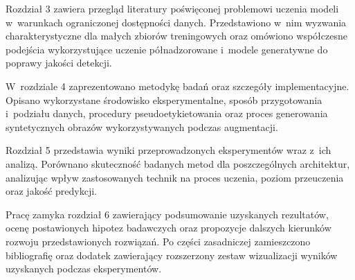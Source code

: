 Rozdział 3 zawiera przegląd literatury poświęconej problemowi uczenia modeli w~warunkach ograniczonej dostępności danych. Przedstawiono w~nim wyzwania charakterystyczne dla małych zbiorów treningowych oraz omówiono współczesne podejścia wykorzystujące uczenie półnadzorowane i~modele generatywne do poprawy jakości detekcji.

W~rozdziale 4 zaprezentowano metodykę badań oraz szczegóły implementacyjne. Opisano wykorzystane środowisko eksperymentalne, sposób przygotowania i~podziału danych, procedury pseudoetykietowania oraz proces generowania syntetycznych obrazów wykorzystywanych podczas augmentacji.

Rozdział 5 przedstawia wyniki przeprowadzonych eksperymentów wraz z~ich analizą. Porównano skuteczność badanych metod dla poszczególnych architektur, analizując wpływ zastosowanych technik na proces uczenia, poziom przeuczenia oraz jakość predykcji.

Pracę zamyka rozdział 6 zawierający podsumowanie uzyskanych rezultatów, ocenę postawionych hipotez badawczych oraz propozycje dalszych kierunków rozwoju przedstawionych rozwiązań. Po części zasadniczej zamieszczono bibliografię oraz dodatek zawierający rozszerzony zestaw wizualizacji wyników uzyskanych podczas eksperymentów.
